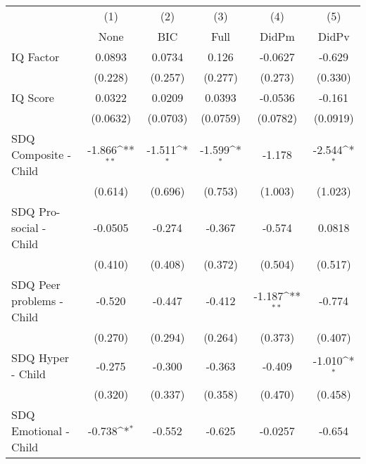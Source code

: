 {
\def\sym#1{\ifmmode^{#1}\else\(^{#1}\)\fi}
\begin{tabular}{l*{5}{c}}
\toprule
            &\multicolumn{1}{c}{(1)}&\multicolumn{1}{c}{(2)}&\multicolumn{1}{c}{(3)}&\multicolumn{1}{c}{(4)}&\multicolumn{1}{c}{(5)}\\
            &\multicolumn{1}{c}{None}&\multicolumn{1}{c}{BIC}&\multicolumn{1}{c}{Full}&\multicolumn{1}{c}{DidPm}&\multicolumn{1}{c}{DidPv}\\
\midrule
IQ Factor   &      0.0893         &      0.0734         &       0.126         &     -0.0627         &      -0.629         \\
            &     (0.228)         &     (0.257)         &     (0.277)         &     (0.273)         &     (0.330)         \\
\addlinespace
IQ Score    &      0.0322         &      0.0209         &      0.0393         &     -0.0536         &      -0.161         \\
            &    (0.0632)         &    (0.0703)         &    (0.0759)         &    (0.0782)         &    (0.0919)         \\
\addlinespace
SDQ Composite - Child&      -1.866\sym{**} &      -1.511\sym{*}  &      -1.599\sym{*}  &      -1.178         &      -2.544\sym{*}  \\
            &     (0.614)         &     (0.696)         &     (0.753)         &     (1.003)         &     (1.023)         \\
\addlinespace
SDQ Pro-social - Child&     -0.0505         &      -0.274         &      -0.367         &      -0.574         &      0.0818         \\
            &     (0.410)         &     (0.408)         &     (0.372)         &     (0.504)         &     (0.517)         \\
\addlinespace
SDQ Peer problems - Child&      -0.520         &      -0.447         &      -0.412         &      -1.187\sym{**} &      -0.774         \\
            &     (0.270)         &     (0.294)         &     (0.264)         &     (0.373)         &     (0.407)         \\
\addlinespace
SDQ Hyper - Child&      -0.275         &      -0.300         &      -0.363         &      -0.409         &      -1.010\sym{*}  \\
            &     (0.320)         &     (0.337)         &     (0.358)         &     (0.470)         &     (0.458)         \\
\addlinespace
SDQ Emotional - Child&      -0.738\sym{*}  &      -0.552         &      -0.625         &     -0.0257         &      -0.654         \\

\end{tabular}}
